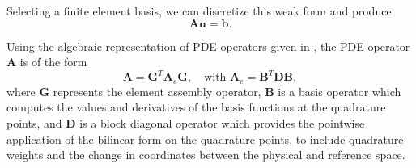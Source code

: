 \documentclass[review]{siamart190516}
\begin{document}
Selecting a finite element basis, we can discretize this weak form and produce
\begin{equation}\label{pdediscrete}
\mathbf{A} \mathbf{u} = \mathbf{b}.
\end{equation}

Using the algebraic representation of PDE operators given in \cite{brown2010efficient}, the PDE operator $\mathbf{A}$ is of the form
\begin{equation}\label{efficienthighorder}
\mathbf{A} = \mathbf{G}^T \mathbf{A}_e \mathbf{G},\quad \text{with} \,\,\mathbf{A}_e = \mathbf{B}^T \mathbf{D} \mathbf{B},
\end{equation}
where $\mathbf{G}$ represents the element assembly operator, $\mathbf{B}$ is a basis operator which computes the values and derivatives of the basis functions at the quadrature points, and $\mathbf{D}$ is a block diagonal operator which provides the pointwise application of the bilinear form on the quadrature points, to include quadrature weights and the change in coordinates between the physical and reference space.
\end{document}
